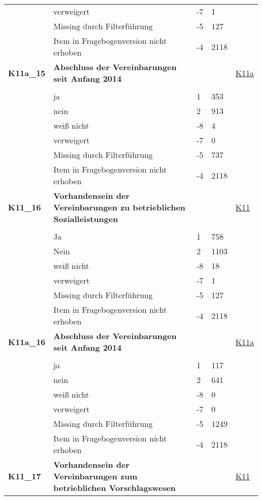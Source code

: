 \begin{longtable}{| L{2.5cm} | L{8.25cm}| C{1.5cm} | R{1.25cm} | C{2.25cm} |  }
   & verweigert & -7 & 1 &  \\ 
   & Missing durch Filterführung & -5 & 127 &  \\ 
   & Item in Fragebogenversion nicht erhoben & -4 & 2118 &  \\ 
   \midrule
\textbf{K11a\_15}\label{var:suf:K11a:15} & \textbf{Abschluss der Vereinbarungen seit Anfang 2014} &  &  & \hyperref[K11a]{K11a} \\ 
   &  &  &  &  \\ 
   & ja & 1 & 353 &  \\ 
   & nein & 2 & 913 &  \\ 
   & weiß nicht & -8 & 4 &  \\ 
   & verweigert & -7 & 0 &  \\ 
   & Missing durch Filterführung & -5 & 737 &  \\ 
   & Item in Fragebogenversion nicht erhoben & -4 & 2118 &  \\ 
   \midrule
\textbf{K11\_16}\label{var:suf:K11:16} & \textbf{Vorhandensein der Vereinbarungen zu betrieblichen Sozialleistungen} &  &  & \hyperref[K11]{K11} \\ 
   &  &  &  &  \\ 
   & Ja & 1 & 758 &  \\ 
   & Nein & 2 & 1103 &  \\ 
   & weiß nicht & -8 & 18 &  \\ 
   & verweigert & -7 & 1 &  \\ 
   & Missing durch Filterführung & -5 & 127 &  \\ 
   & Item in Fragebogenversion nicht erhoben & -4 & 2118 &  \\ 
   \midrule
\textbf{K11a\_16}\label{var:suf:K11a:16} & \textbf{Abschluss der Vereinbarungen seit Anfang 2014} &  &  & \hyperref[K11a]{K11a} \\ 
   &  &  &  &  \\ 
   & ja & 1 & 117 &  \\ 
   & nein & 2 & 641 &  \\ 
   & weiß nicht & -8 & 0 &  \\ 
   & verweigert & -7 & 0 &  \\ 
   & Missing durch Filterführung & -5 & 1249 &  \\ 
   & Item in Fragebogenversion nicht erhoben & -4 & 2118 &  \\ 
   \midrule
\textbf{K11\_17}\label{var:suf:K11:17} & \textbf{Vorhandensein der Vereinbarungen zum betrieblichen Vorschlagswesen} &  &  & \hyperref[K11]{K11} \\ 

\end{longtable}

